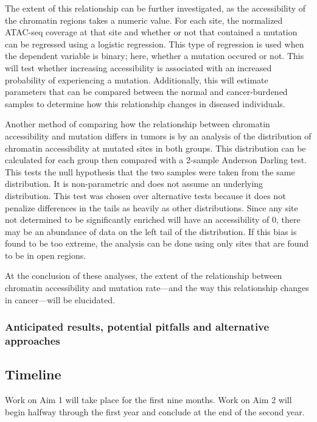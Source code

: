 The extent of this relationship can be further investigated, as the accessibility of the chromatin regions takes a numeric value. For each site, the normalized ATAC-seq coverage at that site and whether or not that contained a mutation can be regressed using a logistic regression. This type of regression is used when the dependent variable is binary; here, whether a mutation occured or not. This will test whether increasing accessibility is associated with an increased probability of experiencing a mutation. Additionally, this will estimate parameters that can be compared between the normal and cancer-burdened samples to determine how this relationship changes in diseased individuals.

Another method of comparing how the relationship between chromatin accessibility and mutation differs in tumors is by an analysis of the distribution of chromatin accessibility at mutated sites in both groups. This distribution can be calculated for each group then compared with a 2-sample Anderson Darling test. This tests the null hypothesis that the two samples were taken from the same distribution. It is non-parametric and does not assume an underlying distribution. This test was chosen over alternative tests because it does not penalize differences in the tails as heavily as other distributions. Since any site not determined to be significantly enriched will have an accessibility of 0, there may be an abundance of data on the left tail of the distribution. If this bias is found to be too extreme, the analysis can be done using only sites that are found to be in open regions.

At the conclusion of these analyses, the extent of the relationship between chromatin accessibility and mutation rate---and the way this relationship changes in cancer---will be elucidated.

\subsubsection{Anticipated results, potential pitfalls and alternative approaches}

\subsection{Timeline}

Work on Aim 1 will take place for the first nine months. Work on Aim 2 will begin halfway through the first year and conclude at the end of the second year.


\clearpage

\printbibliography

